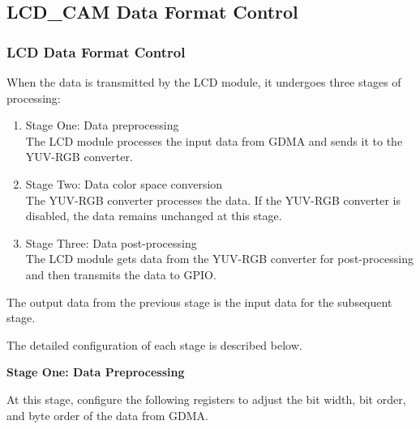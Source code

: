 \documentclass[main\_\_EN.tex]{subfiles}
\begin{document}
\subsection{LCD\_CAM Data Format Control}
\subsubsection{LCD Data Format Control} \label{lcd_data_control}

When the data is transmitted by the LCD module, it undergoes three stages of processing:

\begin{enumerate}
    \item Stage One: Data preprocessing\\
   The LCD module processes the input data from GDMA and sends it to the YUV-RGB converter.
    \item Stage Two: Data color space conversion\\
    The YUV-RGB converter processes the data. If the YUV-RGB converter is disabled, the data remains unchanged at this stage.
    \item Stage Three: Data post-processing\\
    The LCD module gets data from the YUV-RGB converter for post-processing and then transmits the data to GPIO.
\end{enumerate}

\begin{tiplisting}
    The output data from the previous stage is the input data for the subsequent stage.
\end{tiplisting}

The detailed configuration of each stage is described below.

\textbf{Stage One: Data Preprocessing}

At this stage, configure the following registers to adjust the bit width, bit order, and byte order of the data from GDMA.
\end{document}
